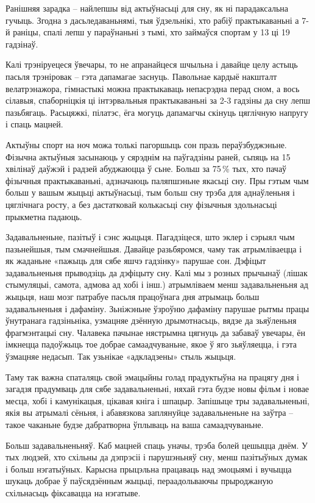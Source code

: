 Ранішняя зарадка – найлепшы від актыўнасьці для сну, як ні парадаксальна гучыць. Згодна з дасьледаваньнямі, тыя ўдзельнікі, хто рабіў практыкаваньні а 7-й раніцы, спалі лепш у параўнаньні з тымі, хто займаўся спортам у 13 ці 19 гадзінаў.

Калі трэніруецеся ўвечары, то не апранайцеся шчыльна і давайце целу астыць пасьля трэніровак – гэта дапамагае заснуць. Павольнае кардыё накшталт велатрэнажора, гімнастыкі можна практыкаваць непасрэдна перад сном, а вось сілавыя, спаборніцкія ці інтэрвальныя практыкаваньні за 2-3 гадзіны да сну лепш пазьбягаць. Расьцяжкі, пілатэс, ёга могуць дапамагчы скінуць цяглічную напругу і спаць мацней.

Актыўны спорт на ноч можа толькі пагоршыць сон празь пераўзбуджэньне. Фізычна актыўныя засынаюць у сярэднім на паўгадзіны раней, сьпяць на 15 хвілінаў даўжэй і радзей абуджаюцца ў сьне. Больш за 75\,\% тых, хто пачаў фізычныя практыкаваньні, адзначаюць паляпшэньне якасьці сну. Пры гэтым чым больш у вашым жыцьці актыўнасьці, тым больш сну трэба для аднаўленьня і цяглічнага росту, а без дастатковай колькасьці сну фізычныя здольнасьці прыкметна падаюць.

Задавальненьне, пазітыў і сэнс жыцьця. Пагадзіцеся, што эклер і сэрыял чым пазьнейшыя, тым смачнейшыя. Давайце разьбяромся, чаму так атрымліваецца і як жаданьне «пажыць для сябе яшчэ гадзінку» парушае сон. Дэфіцыт задавальненьня прыводзіць да дэфіцыту сну. Калі мы з розных прычынаў (лішак стымуляцыі, самота, адмова ад хобі і інш.) атрымліваем менш задавальненьня ад жыцьця, наш мозг патрабуе пасьля працоўнага дня атрымаць больш задавальненьня і дафаміну. Зьніжэньне ўзроўню дафаміну парушае рытмы працы ўнутранага гадзіньніка, узмацняе дзённую дрымотнасьць, вядзе да зьяўленьня фрагмэнтацыі сну. Чалавека пачынае нястрымна цягнуць да забаваў увечары, ён імкнецца падоўжыць тое добрае самаадчуваньне, якое ў яго зьяўляецца, і гэта ўзмацняе недасып. Так узьнікае «адкладзены» стыль жыцьця.

Таму так важна спаталяць свой эмацыйны голад прадуктыўна на працягу дня і загадзя прадумваць для сябе задавальненьні, няхай гэта будзе новы фільм і новае месца, хобі і камунікацыя, цікавая кніга і шпацыр. Запішыце тры задавальненьні, якія вы атрымалі сёньня, і абавязкова заплянуйце задавальненьне на заўтра – такое чаканьне будзе дабратворна ўплываць на ваша самаадчуваньне.

Больш задавальненьняў. Каб мацней спаць уначы, трэба болей цешыцца днём. У тых людзей, хто схільны да дэпрэсіі і парушэньняў сну, менш пазітыўных думак і больш нэгатыўных. Карысна прыцэльна працаваць над эмоцыямі і вучыцца шукаць добрае ў паўсядзённым жыцьці, пераадольваючы прыроджаную схільнасьць фіксавацца на нэгатыве.

